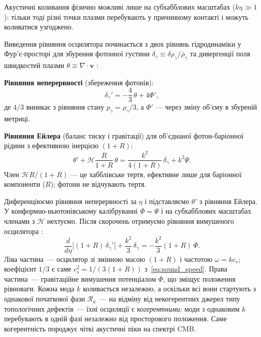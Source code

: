 \documentclass[12pt, a4paper]{article}
\begin{document}
Акустичні коливання фізично можливі лише на субхабблових
масштабах ($k\eta \gg 1$): тільки тоді різні точки плазми
перебувають у причинному контакті і можуть коливатися
узгоджено.

Виведення рівняння осцилятора починається з двох рівнянь
гідродинаміки у Фур'є-просторі для збурення фотонної густини
$\delta_\gamma \equiv \delta\rho_\gamma/\bar{\rho}_\gamma$
та дивергенції поля швидкостей плазми $\theta \equiv \nabla\cdot\mathbf{v}$
\cite{dodelson_2020}:

\textbf{Рівняння неперервності} (збереження фотонів):
\begin{equation*}
  \delta_\gamma' = -\frac{4}{3}\,\theta + 4\Phi',
\end{equation*}
де $4/3$ виникає з рівняння стану $p_\gamma = \rho_\gamma/3$,
а $\Phi'$ — через зміну об'єму в збуреній метриці.

\textbf{Рівняння Ейлера} (баланс тиску і гравітації) для
об'єднаної фотон-баріонної рідини з ефективною інерцією $(1+R)$:
\begin{equation*}
  \theta' + \mathcal{H}\frac{R}{1+R}\,\theta
  = \frac{k^2}{4(1+R)}\,\delta_\gamma + k^2\Psi.
\end{equation*}
Член $\mathcal{H}R/(1+R)$ — це хабблівське тертя, ефективне
лише для баріонної компоненти ($R$); фотони не відчувають тертя.

Диференціюємо рівняння неперервності за $\eta$ і підставляємо
$\theta'$ з рівняння Ейлера. У конформно-ньютонівському
калібруванні $\Phi = \Psi$ і на субхабблових масштабах
членами з $\mathcal{H}$ нехтуємо. Після скорочень отримуємо
рівняння вимушеного осцилятора \cite{dodelson_2020}:
\begin{equation}\label{eq:acoustic_oscillator}
  \frac{d}{d\eta}\bigl[(1+R)\,\delta_\gamma'\bigr]
  + \frac{k^2}{3}\,\delta_\gamma
  = -\frac{k^2}{3}(1+R)\,\Phi.
\end{equation}
Ліва частина~--- осцилятор зі змінною масою $(1+R)$
і частотою $\omega = kc_s$; коефіцієнт $1/3$ є саме
$c_s^2 = 1/(3(1+R))$ з~\eqref{eq:sound_speed}. Права
частина~--- гравітаційне вимушення потенціалом $\Phi$,
що зміщує положення рівноваги. Кожна мода $k$ коливається
незалежно, а оскільки всі вони стартують з однакової
початкової фази $\mathcal{R}_k$~--- на відміну від
некогерентних джерел типу топологічних дефектів~--- їхні
осциляції є \emph{когерентними}: моди з однаковим $k$
перебувають в одній фазі незалежно від просторового
положення. Саме когерентність породжує чіткі акустичні
піки на спектрі CMB.
\end{document}
